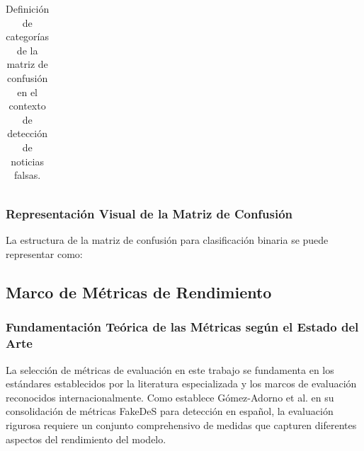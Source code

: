 \begin{table}[htbp]
{\begin{tabular}{|l|l|l|l|}
\hline
\end{tabular}
}
\caption{Definición de categorías de la matriz de confusión en el contexto de detección de noticias falsas.}
\label{tab:matriz_confusion_conceptos}
\end{table}

\subsubsection{Representación Visual de la Matriz de Confusión}

La estructura de la matriz de confusión para clasificación binaria se puede representar como:

\begin{table}[htbp]
\centering
{}
\caption{Estructura de la matriz de confusión para clasificación binaria.}
\label{tab:estructura_matriz_confusion}
\end{table}

\subsection{Marco de Métricas de Rendimiento}

\subsubsection{Fundamentación Teórica de las Métricas según el Estado del Arte}

La selección de métricas de evaluación en este trabajo se fundamenta en los estándares establecidos por la literatura especializada y los marcos de evaluación reconocidos internacionalmente. Como establece Gómez-Adorno et al. \cite{gomez2021overview} en su consolidación de métricas FakeDeS para detección en español, la evaluación rigurosa requiere un conjunto comprehensivo de medidas que capturen diferentes aspectos del rendimiento del modelo.

